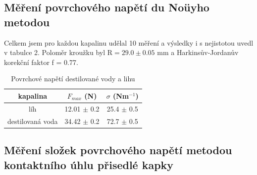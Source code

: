 \documentclass[a4paper,11pt]{article}
\begin{document}
\subsection{Měření povrchového napětí du Noüyho metodou}

Celkem jsem pro každou kapalinu udělal 10 měření a výsledky i s nejistotou uvedl v tabulce 2. Poloměr kroužku byl R$= 29.0 \pm 0.05$ mm a Harkinsův-Jordanův korekční faktor f = 0.77.


\begin{table}[htpb]
  \centering
  \begin{tabular}{| c | c | c |}
    \hline
    kapalina & $F_{max}$ (N) & $\sigma$ (Nm$^{-1}$) \\\hline
    líh & 12.01 $\pm$ 0.2 & 25.4 $\pm$ 0.5 \\
    destilovaná voda & 34.42 $\pm$ 0.2 & 72.7 $\pm$ 0.5 \\ \hline
  \end{tabular}
  \caption{Povrchové napětí destilované vody a lihu}
\end{table}

\vspace{-10pt}

\subsection{Měření složek povrchového napětí metodou kontaktního úhlu přisedlé kapky}
\end{document}
